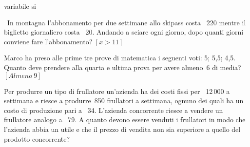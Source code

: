{{{{%
variabile 
si 

\begin{multicols}{2}
 \begin{esercizio}[\Ast]
 \label{ese:21.23}
 \ In montagna l'abbonamento per due settimane allo
skipass costa \officialeuro\ 220 mentre il biglietto giornaliero costa
\officialeuro\ 20. Andando a sciare ogni giorno, dopo quanti giorni
conviene fare l'abbonamento? \hfill \(\left[x>11\right]\)
 \end{esercizio}

 \begin{esercizio}[\Ast]
 \label{ese:21.24}
 Marco ha preso alle prime tre prove di matematica i seguenti voti: 5;
5,5; 4,5. Quanto deve prendere alla quarta e ultima prova per avere almeno~6
di media? \hfill \(\left[Almeno~9\right]\)
 \end{esercizio}

 \begin{esercizio}
 \label{ese:21.25}
 Per produrre un tipo di frullatore un'azienda ha dei
costi fissi per \officialeuro\ 12\,000 a settimana e riesce a produrre~850
frullatori a settimana, ognuno dei quali ha un costo di produzione pari
a \officialeuro\ 34. L'azienda concorrente riesce a
vendere un frullatore analogo a \officialeuro\ 79. A quanto devono essere
venduti i frullatori in modo che l'azienda abbia un
utile e che il prezzo di vendita non sia superiore a quello del
prodotto concorrente?
 \end{esercizio}


\end{multicols}}}}}
